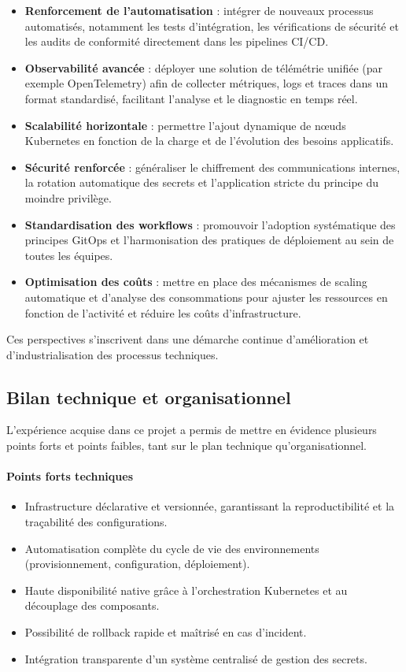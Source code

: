 \begin{itemize}
	\item \textbf{Renforcement de l’automatisation} : intégrer de nouveaux processus automatisés, notamment les tests d’intégration, les vérifications de sécurité et les audits de conformité directement dans les pipelines CI/CD.
	\item \textbf{Observabilité avancée} : déployer une solution de télémétrie unifiée (par exemple OpenTelemetry) afin de collecter métriques, logs et traces dans un format standardisé, facilitant l’analyse et le diagnostic en temps réel.
	\item \textbf{Scalabilité horizontale} : permettre l’ajout dynamique de nœuds Kubernetes en fonction de la charge et de l’évolution des besoins applicatifs.
	\item \textbf{Sécurité renforcée} : généraliser le chiffrement des communications internes, la rotation automatique des secrets et l’application stricte du principe du moindre privilège.
	\item \textbf{Standardisation des workflows} : promouvoir l’adoption systématique des principes GitOps et l’harmonisation des pratiques de déploiement au sein de toutes les équipes.
	\item \textbf{Optimisation des coûts} : mettre en place des mécanismes de scaling automatique et d’analyse des consommations pour ajuster les ressources en fonction de l’activité et réduire les coûts d’infrastructure.
\end{itemize}

Ces perspectives s’inscrivent dans une démarche continue d’amélioration et d’industrialisation des processus techniques.

\subsection{Bilan technique et organisationnel}

L’expérience acquise dans ce projet a permis de mettre en évidence plusieurs points forts et points faibles, tant sur le plan technique qu’organisationnel.

\paragraph{Points forts techniques}
\begin{itemize}
	\item Infrastructure déclarative et versionnée, garantissant la reproductibilité et la traçabilité des configurations.
	\item Automatisation complète du cycle de vie des environnements (provisionnement, configuration, déploiement).
	\item Haute disponibilité native grâce à l’orchestration Kubernetes et au découplage des composants.
	\item Possibilité de rollback rapide et maîtrisé en cas d’incident.
	\item Intégration transparente d’un système centralisé de gestion des secrets.
\end{itemize}

